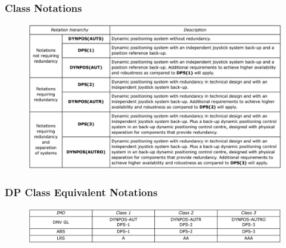 \newpage
\subsubsection{Class Notations}\label{Sec:Class_Notations} 
\begin{figure}[h]
    \centering
    \includegraphics[width = \textwidth]{figures/DP_Class_notations.eps}
\end{figure}

\subsubsection{DP Class Equivalent Notations}\label{Sec:Equivalent_Notations} 
\begin{figure}[h]
    \centering
    \includegraphics[width = \textwidth]{figures/DP_Class_equivalent_notations.eps}
\end{figure}
